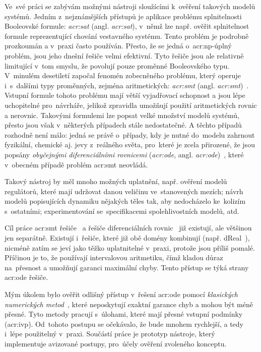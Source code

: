 \documentclass[thesis=M,czech]{FITthesis}[2012/06/26]
\newcommand{\acrlabel}[1]{acr:#1}
\newcommand{\acr}[1]{\acrshort{\acrlabel{#1}}}
\newcommand{\acrl}[1]{\acrlong{\acrlabel{#1}}}
\newcommand{\hl}[1]{\textit{#1}}
\newcommand{\name}[1]{\hl{#1}}
\newcommand{\cit}[1]{\cite{#1}}
\begin{document}
\begin{introduction}
Ve~své práci se zabývám možnými nástroji
sloužícími k~ověření takových modelů systémů.
Jedním z~nejznámějších přístupů
je aplikace problému splnitelnosti Booleovské formule:
\name{\acr{sat}} (angl. \name{\acrl{sat}}),
v~němž lze např. ověřit splnitelnost
formule reprezentující chování vestavného systému.
Tento problém je podrobně prozkoumán
a v~praxi často používán.
Přesto, že se jedná o~\acr{np}-úplný problém,
jsou jeho dnešní řešiče velmi efektivní.
Tyto řešiče jsou ale relativně limitující
v~tom smyslu, že povolují pouze proměnné Booleovského typu.
V~minulém desetiletí započal fenomén
zobecněného problému,
který operuje i~s~dalšími typy proměnných,
zejména aritmetických: \name{\acr{smt}}
(angl. \name{\acrl{smt}})~\cit{smt-de_moura}\cit{smt}.
Vstupní formule tohoto problému mají
větší vyjadřovací schopnost
a jsou lépe uchopitelné pro~návrháře,
jelikož zpravidla umožňují použití
aritmetických rovnic a nerovnic.
Takovými formulemi lze popsat velké množství modelů systémů,
přesto jsou však v~některých případech stále nedostatečné.
A těchto případů rozhodně není málo:
jedná se právě o~případy, kdy je nutné
do~modelu zahrnout fyzikální, chemické aj.
jevy z~reálného světa,
pro~které je zcela přirozené,
že jsou popsány \name{obyčejnými diferenciálními rovnicemi}
(\name{\acr{ode}}, angl. \name{\acrl{ode}})~\cit{ode-lec}\cit{ode},
které v~obecném případě problém \acr{smt} neovládá.

Takový nástroj by měl mnoho možných uplatnění,
např. ověření modelů regulátorů,
které mají udržovat danou veličinu ve~stanovených mezích;
návrh modelů popisujících dynamiku nějakých těles
tak, aby nedocházelo ke~kolizím s~ostatními;
experimentování se~specifikacemi
spolehlivostních modelů,
atd.


\begin{section}{Cíl práce}\label{s:intro:goal}
\acr{smt} řešiče~\cit{opensmt-art}\cit{cvc4-art}
a řešiče diferenciálních rovnic~\cit{sundials-art}\cit{odeint-art}
již existují, ale většinou jen separátně.
Existují i~řešiče, které již obě domény kombinují
(např. dReal~\cit{dreal-smo-art}),
nicméně zatím se jeví jako těžko uplatnitelné v~praxi,
protože jsou příliš pomalé.
Příčinou je to, že používají intervalovou aritmetiku,
čímž kladou důraz na~přesnost
a umožňují garanci maximální chyby.
Tento přístup se týká strany
\acr{ode} řešiče.

Mým úkolem bylo ověřit
odlišný přístup v~řešení \acr{ode}
pomocí \name{klasických numerických metod}~\cit{ode-nsolve-intro},
které neposkytují exaktní garance chyb
a mohou být méně přesné.
Tyto metody pracují s~úlohami,
které mají přesné vstupní podmínky (\acr{ivp}).
Od~tohoto postupu se očekávalo,
že bude mnohem rychlejší,
a tedy i~lépe použitelný v~praxi.
Součástí práce je prototyp nástroje,
který implementuje avizované postupy,
pro~účely ověření zvoleného konceptu.


\end{section}
\end{introduction}
\end{document}
